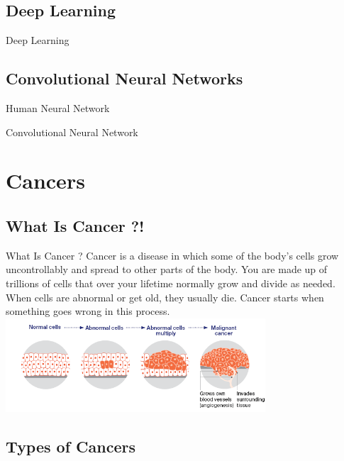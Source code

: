 \documentclass{beamer}
\begin{document}
    \subsection{Deep Learning}
    \begin{frame}[t]{Deep Learning}
    \end{frame}
    
    \subsection{Convolutional Neural Networks}
    \begin{frame}{Human Neural Network}
    \end{frame}
    
    \begin{frame}{Convolutional Neural Network}
    \end{frame}

    \section{Cancers}
    \subsection{What Is Cancer ?!}
    \begin{frame}{What Is Cancer ?} 
      \centering
      Cancer is a disease in which some of the body’s cells grow uncontrollably and spread to other parts of the body. 
      You are made up of trillions of cells that over your lifetime normally grow and divide as needed. When cells are abnormal or get old, they usually die. Cancer starts when something goes wrong in this process.
      \vfill
      \includegraphics[height=3.5cm]{resources/How_cancer_starts}
    \end{frame}
    \subsection{Types of Cancers}
\end{document}
